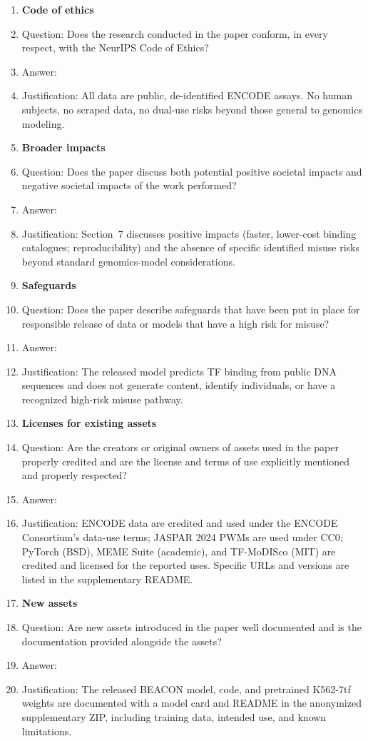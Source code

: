 \begin{enumerate}
\item {\bf Code of ethics}
    \item[] Question: Does the research conducted in the paper conform, in every respect, with the NeurIPS Code of Ethics?
    \item[] Answer: \answerYes{}
    \item[] Justification: All data are public, de-identified ENCODE assays. No human subjects, no scraped data, no dual-use risks beyond those general to genomics modeling.

\item {\bf Broader impacts}
    \item[] Question: Does the paper discuss both potential positive societal impacts and negative societal impacts of the work performed?
    \item[] Answer: \answerYes{}
    \item[] Justification: Section~7 discusses positive impacts (faster, lower-cost binding catalogues; reproducibility) and the absence of specific identified misuse risks beyond standard genomics-model considerations.

\item {\bf Safeguards}
    \item[] Question: Does the paper describe safeguards that have been put in place for responsible release of data or models that have a high risk for misuse?
    \item[] Answer: \answerNA{}
    \item[] Justification: The released model predicts TF binding from public DNA sequences and does not generate content, identify individuals, or have a recognized high-risk misuse pathway.

\item {\bf Licenses for existing assets}
    \item[] Question: Are the creators or original owners of assets used in the paper properly credited and are the license and terms of use explicitly mentioned and properly respected?
    \item[] Answer: \answerYes{}
    \item[] Justification: ENCODE data are credited and used under the ENCODE Consortium's data-use terms; JASPAR 2024 PWMs are used under CC0; PyTorch (BSD), MEME Suite (academic), and TF-MoDISco (MIT) are credited and licensed for the reported uses. Specific URLs and versions are listed in the supplementary README.

\item {\bf New assets}
    \item[] Question: Are new assets introduced in the paper well documented and is the documentation provided alongside the assets?
    \item[] Answer: \answerYes{}
    \item[] Justification: The released BEACON model, code, and pretrained K562-7tf weights are documented with a model card and README in the anonymized supplementary ZIP, including training data, intended use, and known limitations.


\end{enumerate}
